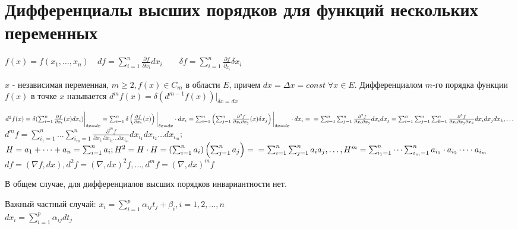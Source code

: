\documentclass[../main.tex]{subfiles}
\begin{document}
\section{Дифференциалы высших порядков для функций нескольких переменных}
$f(x)= f(x_{1},\dots,x_{n})\quad df=\sum_{i =1}^{n}\frac{\partial{f}}{\partial{x_{i}}}dx_{i} \qquad \delta f = \sum_{i  =1}^{n  } \frac{\partial{f}}{\partial_{x_{i}}}\delta x_{i}$
\begin{definition}
    $x$ - независимая переменная, $m\geqslant 2 , f(x) \in C_{m}$ в области $E$, причем $dx = \Delta x = const \; \forall x\in E$. Дифференциалом $m$-го порядка функции $f(x)$ в точке $x$ называется $d^{m}f(x) = \delta \left( d^{m-1}f(x)\right)\bigg|_{\delta x = dx}$
\end{definition}
\noindent $d^{2}f(x) = \delta ( \sum_{ i  =1}^{n} \frac{\partial{f}}{\partial{x_{i}}}(x)dx_{i})\bigg|_{\delta x = dx} = \sum_{i   =1}^{n} \delta\left( \frac{\partial{f}}{\partial{x_{i}}}(x)\right)\bigg|_{\delta x = dx}\cdot dx_{i}= \sum_{i   =1}^{n  } \left( \sum_{j=1}^{n} \frac{\partial^{2}{f}}{\partial{x_{i}}\partial{x_{j}}}(x)\delta x_{j}\right)\bigg|_{\delta x = dx} \cdot dx_{i} =\\= \sum_{i   =1}^{n  } \sum_{j=1}^{n} \frac{\partial^{2}{f}}{\partial{x_{i}}\partial{x_{j}}}dx_{i}dx_{j} = \sum_{i   =1}^{n  }\sum_{j=1}^{n}\sum_{k=1}^{n} \frac{\partial^{3}{f}}{\partial{x_{i}}\partial{x_{j}}\partial{x_{k}}}dx_{i}dx_{j}dx_{k}, \dots$  \\ 
$d^{m}f = \sum_{i_{1}   =1}^{n  } \dots \sum_{i_{m}=1}^{n} \frac{\partial^{m}{f}}{\partial{x_{i_{1}}}\partial{x_{i_{2}}}\dots\partial{x_{i_{m}}}}dx_{i_{1}}dx_{i_{2}}\dots dx_{i_{m}}$; $H = a_{1}  + \dots +a_{n} = \sum_{ i   =1}^{n  } a_{i}; H^{2} = H\cdot H = \left(\sum_{i   =1}^{n} a_{i}\right)\left( \sum_{j=1}^{n} a_{j}\right) =\\= \sum_{i   =1}^{n  } \sum_{j=1}^{n} a_{i}a_{j}, \dots , H^{m} = \sum_{i_{1}   =1}^{n  } \dots \sum_{i_{m}=1}^{n} a_{i_{1}}\cdot  a_{i_{2}}\dots \cdot a_{i_{m}}$\\   
$df = (\nabla f ,dx), d^{2}f = (\nabla , dx)^{2} f,\dots, d^{m}f = (\nabla,dx)^{m}f$

В общем случае, для дифференциалов высших порядков инвариантности нет. 

Важный частный случай: $ x_{i} = \sum_{i    =1}^{p} \alpha_{ij}t_{j} + \beta_{i}, i =1,2,\dots,n$ 
\\$dx_{i} = \sum_{i =1}^{p  } \alpha_{ij}dt_{j}$ 
\end{document}
